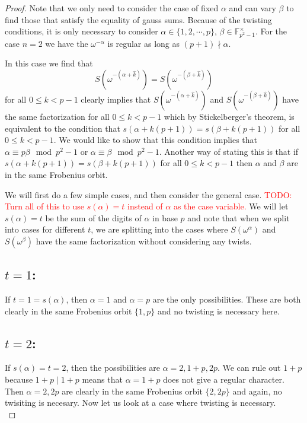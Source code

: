 \documentclass[12pt]{article}
\theoremstyle{customtheorem}%
\theoremstyle{remark}
\theoremstyle{definition}
\numberwithin{equation}{section}
\numberwithin{theorem}{section}
\newcommand{\F}{\mathbb{F}}
\begin{document}
\begin{proof}
Note that we only need to consider the case of fixed $\alpha$ and can vary $\beta$ to find those that satisfy the equality of gauss sums. 
Because of the twisting conditions, it is only necessary to consider $\alpha \in \{1, 2, \cdots , p\}$, $\beta \in \F_{p^2-1}^\times$. 
For the case $n=2$ we have the $\omega^{-\alpha}$ is regular as long as $(p+1)\nmid \alpha$.

In this case we find that \[S(\omega^{-(\alpha + \hat{k})}) = S(\omega^{-(\beta + \hat{k})})\] for all $0 \leq k < p-1$ clearly implies that $S(\omega^{-(\alpha+\hat{k})})$ and $S(\omega^{-(\beta + \hat{k})})$ have the same factorization for all $0 \leq k < p-1$ which by Stickelberger's theorem, is equivalent to the condition that $s(\alpha + k(p+1)) = s(\beta + k(p+1))$ for all $0 \leq k < p-1$. 
We would like to show that this condition implies that $\alpha \equiv p \beta \mod p^2 -1$ or $\alpha \equiv \beta \mod p^2 - 1$. Another way of stating this is that if $s(\alpha + k(p+1)) = s(\beta+k(p+1))$ for all $0 \leq k < p-1$ then $\alpha$ and $\beta$ are in the same Frobenius orbit.

We will first do a few simple cases, and then consider the general case.
\textcolor{red}{TODO: Turn all of this to use $s(\alpha) = t$ instead of $\alpha$ as the case variable.}
We will let $s(\alpha) = t$ be the sum of the digits of $\alpha$ in base $p$ and note that when we split into cases for different $t$, we are splitting into the cases where $S(\omega^\alpha)$ and  $S(\omega^\beta)$ have the same factorization without considering any twists.
\\

\subsection{$t = 1$:} If $t = 1 = s(\alpha)$, then $\alpha = 1$ and $\alpha = p$ are the only possibilities. These are both clearly in the same Frobenius orbit $\{1,p\}$ and no twisting is necessary here.
\\

\subsection{$t = 2$:} If $s(\alpha) = t = 2$, then the possibilities are $\alpha = 2, 1+p, 2p$. We can rule out $1+p$ because $1+p \mid 1+p$ means that $\alpha = 1+p$ does not give a regular character. Then $\alpha = 2, 2p$ are clearly in the same Frobenius orbit $\{2,2p\}$ and again, no twisiting is necesary. Now let us look at a case where twisting is necessary.
\\


\end{proof}
\end{document}
